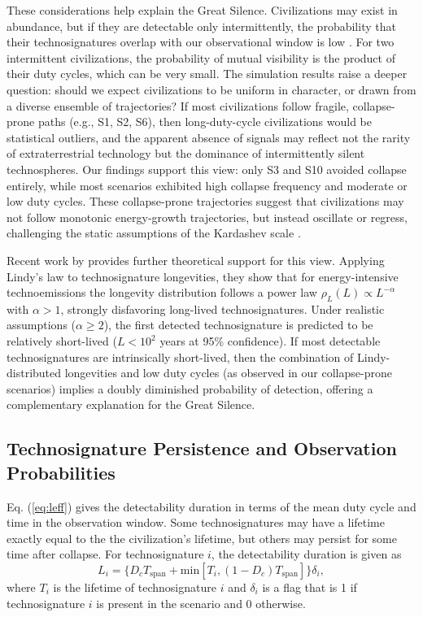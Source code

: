 These considerations help explain the Great Silence. Civilizations may exist in abundance, but if they are detectable only intermittently, the probability that their technosignatures overlap with our observational window is low \citep{Balbi2018-fp}. For two intermittent civilizations, the probability of mutual visibility is the product of their duty cycles, which can be very small. The simulation results raise a deeper question: should we expect civilizations to be uniform in character, or drawn from a diverse ensemble of trajectories? If most civilizations follow fragile, collapse-prone paths (e.g., S1, S2, S6), then long-duty-cycle civilizations would be statistical outliers, and the apparent absence of signals may reflect not the rarity of extraterrestrial technology but the dominance of intermittently silent technospheres. Our findings support this view: only S3 and S10 avoided collapse entirely, while most scenarios exhibited high collapse frequency and moderate or low duty cycles. These collapse-prone trajectories suggest that civilizations may not follow monotonic energy-growth trajectories, but instead oscillate or regress, challenging the static assumptions of the Kardashev scale \citep{Kardashev1964-gv}.

Recent work by \citet{Balbi2024-bg} provides further theoretical support for this view. Applying Lindy's law to technosignature longevities, they show that for energy-intensive technoemissions the longevity distribution follows a power law $\rho_L(L) \propto L^{-\alpha}$ with $\alpha > 1$, strongly disfavoring long-lived technosignatures. Under realistic assumptions ($\alpha \geq 2$), the first detected technosignature is predicted to be relatively short-lived ($L < 10^2$ years at 95\% confidence). If most detectable technosignatures are intrinsically short-lived, then the combination of Lindy-distributed longevities and low duty cycles (as observed in our collapse-prone scenarios) implies a doubly diminished probability of detection, offering a complementary explanation for the Great Silence.

\subsection{Technosignature Persistence and Observation Probabilities}\label{technosignature-persistence}

Eq. (\ref{eq:leff}) gives the detectability duration in terms of the mean duty cycle and time in the observation window. Some technosignatures may have a lifetime exactly equal to the the civilization's lifetime, but others may persist for some time after collapse. For technosignature $i$, the detectability duration is given as
\begin{equation}
    L_{i}=\{D_cT_{\text{span}} + \text{min}[T_i, (1-D_c)T_{\text{span}}]\}\delta_{i},
\end{equation}
where $T_i$ is the lifetime of technosignature $i$ and $\delta_{i}$ is a flag that is 1 if technosignature $i$ is present in the scenario and 0 otherwise.

